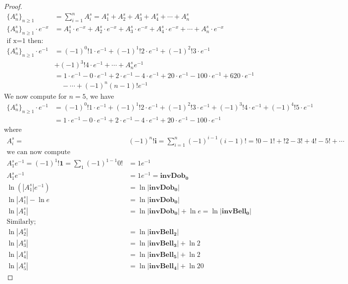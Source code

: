 \documentclass[10pt,a4paper]{amsart}
\begin{document}
\begin{proof}
    \begin{align*}
   \lbrace A_n^s\rbrace_{n\geq 1}&=\sum_{i=1}^{n}A_i^s=A_1^s + A_2^s + A_3^s +A_4^s +\cdots + A_n^s\\
\lbrace A_n^s\rbrace_{n\geq 1}\cdotp e^{-x}&= A_1^s\cdotp e^{-x} + A_2^s \cdotp e^{-x}+ A_3^s \cdotp e^{-x}+A_4^s \cdotp e^{-x}+\cdots + A_n^s \cdotp e^{-x}\\ 
\mbox{if x=1 then:}\\
\lbrace A_n^s\rbrace_{n\geq 1}\cdotp e^{-1}&= (-1)^0 !1\cdotp e^{-1} + (-1)^1 !2\cdotp e^{-1} + (-1)^2 !3\cdotp e^{-1} \\
&+ (-1)^3 !4\cdotp e^{-1} +\cdots + A_n^s e^{-1}\\
&= 1\cdotp e^{-1} -  0\cdotp e^{-1} + 2\cdotp e^{-1} - 4\cdotp e^{-1} + 20\cdotp e^{-1} -100\cdotp e^{-1}+ 620\cdotp e^{-1}\\
&\quad -\cdots+(-1)^n(n-1)!e^{-1}
\end{align*}
We now compute for $n=5$,  we have  
\begin{align*}
    \lbrace A_n^s\rbrace_{n\geq 1}\cdotp e^{-1}&= (-1)^0 !1\cdotp e^{-1} + (-1)^1 !2\cdotp e^{-1} + (-1)^2 !3\cdotp e^{-1} + (-1)^3 !4\cdotp e^{-1} +(-1)^4 !5\cdotp e^{-1}\\
&= 1\cdotp e^{-1} -  0\cdotp e^{-1} + 2\cdotp e^{-1} - 4\cdotp e^{-1} + 20\cdotp e^{-1} -100\cdotp e^{-1}
\end{align*}
where 
\begin{align*}
A_i^s=&(-1)^n\mathbf{!i}=\sum_{i=1}^{n}(-1)^{i-1}(i-1)!= !0 - 1!+ !2 - 3! + 4!- 5!  + \cdots \\ \mbox{we can now compute}\\
 A_1^se^{-1}=(-1)^1\mathbf{!1}=\sum_{1}(-1)^{1-1}0!&= 1e^{-1}\\
 A_1^se^{-1}&=1e^{-1}=\mathbf{invDob_0}\\
 \ln{( |A_1^s|e^{-1})}&=\ln |\mathbf{invDob_0}|\\
  \ln{ |A_1^s|}-\ln{e}&=\ln |\mathbf{invDob_0}|\\
  \ln{| A_1^s|}&=\ln |\mathbf{invDob_0}|+\ln{e}=\ln |\mathbf{invBell_0}|\\
  \mbox{Similarly;}\\
\ln |A_2^s|&=\ln |\mathbf{invBell_2}|\\
\ln |A_3^s|&=\ln |\mathbf{invBell_3}|+ \ln2\\
\ln |A_4^s|&=\ln |\mathbf{invBell_5}| + \ln2\\
\ln |A_5^s|&=\ln |\mathbf{invBell_4}| + \ln20
\end{align*}

\end{proof}
\end{document}
